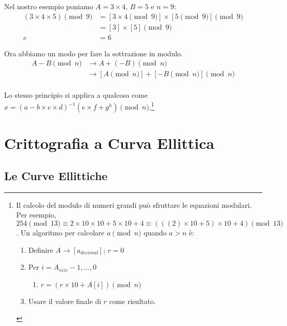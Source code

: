 Nel nostro esempio poniamo \(A = 3 \times 4\), \(B = 5\) e \(n = 9\):\vspace{.175cm}
\begin{align*}
(3 \times 4 \times 5) \pmod{9} &= {[3 \times 4 \pmod{9}] \times [5 \pmod{9}]} \pmod{9} \\
                               &= [3] \times [5] \pmod{9} \\
                               c &= 6
\end{align*}

Ora abbiamo un modo per fare la sottrazione in modulo.\vspace{.175cm}
\begin{align*}
A - B \pmod n &\rightarrow A + (-B) \pmod n \\
			  &\rightarrow {[A \pmod{n}] + [-B \pmod{n}]} \pmod{n}
\end{align*}\\

Lo stesso principio si applica a qualcosa come \(x = (a - b \times c \times d)^{-1} (e \times f + g^{h}) \pmod n\).\footnote{Il calcolo del modulo di numeri grandi può sfruttare le equazioni modulari. Per esempio, \(254 \pmod{13} \equiv 2 \times 10 \times 10 + 5 \times 10 + 4 \equiv (((2) \times 10 + 5) \times 10 + 4) \pmod{13}\). Un algoritmo per calcolare \(a \pmod n\) quando \(a > n\) è:
\begin{enumerate}
    \item Definire \(A \rightarrow [a_{decimal}]\); \(r = 0\)
    \item Per \(i = A_{size} - 1, ..., 0\)
    \begin{enumerate}
        \item \(r = (r \times 10 + A[i]) \pmod n\)
    \end{enumerate}
    \item Usare il valore finale di \(r\) come risultato.
\end{enumerate}}



\section{Crittografia a Curva Ellittica}
\label{EllipticCurveCryptography}


\subsection{Le Curve Ellittiche}
\label{elliptic_curves_section}

